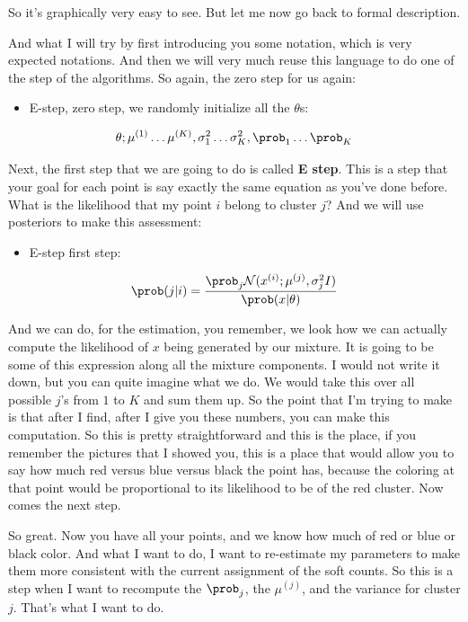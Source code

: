 \documentclass[a4paper, 12pt]{article}
\begin{document}
So it's graphically very easy to see.
But let me now go back to formal description.

And what I will try by first introducing you some notation, which is very
expected notations. And then we will very much reuse this language to do one of
the step of the algorithms. So again, the zero step for us again:

\begin{itemize}
\item E-step, zero step, we randomly initialize all the \(\theta\)s:
\end{itemize}
\begin{equation}
\label{eq:org0264e7d}
\theta; \mu^{(1)} \ldots \mu^{(K)}, \sigma_{1}^{2} \ldots \sigma_{K}^{2}, \prob_1 \ldots \prob_K
\end{equation}

Next, the first step that we are going to do is called \textbf{E step}.
This is a step that your goal for each point
is say exactly the same equation as you've
done before.
What is the likelihood that my point \(i\) belong to cluster \(j\)?
And we will use posteriors to make this assessment:

\begin{itemize}
\item E-step first step:
\end{itemize}
\begin{equation}
\label{eq:orga68cc82}
\prob(j|i) = \frac{\prob_j \mathcal{N}(x^{(i)}; \mu^{(j)}, \sigma_{j}^2 I)}{\prob(x|\theta)}
\end{equation}

And we can do, for the estimation, you remember, we look how we can actually
compute the likelihood of \(x\) being generated by our mixture. It is going to
be some of this expression along all the mixture components. I would not write
it down, but you can quite imagine what we do. We would take this over all
possible \(j\)'s from \(1\) to \(K\) and sum them up. So the point that I'm
trying to make is that after I find, after I give you these numbers, you can
make this computation. So this is pretty straightforward and this is the place,
if you remember the pictures that I showed you, this is a place that would allow
you to say how much red versus blue versus black the point has, because the
coloring at that point would be proportional to its likelihood to be of the red
cluster. Now comes the next step.

So great. Now you have all your points, and we know how much of red or blue or
black color. And what I want to do, I want to re-estimate my parameters to make
them more consistent with the current assignment of the soft counts. So this is
a step when I want to recompute the \(\prob_j\), the \(\mu^{(j)}\), and the
variance for cluster \(j\). That's what I want to do.
\end{document}
